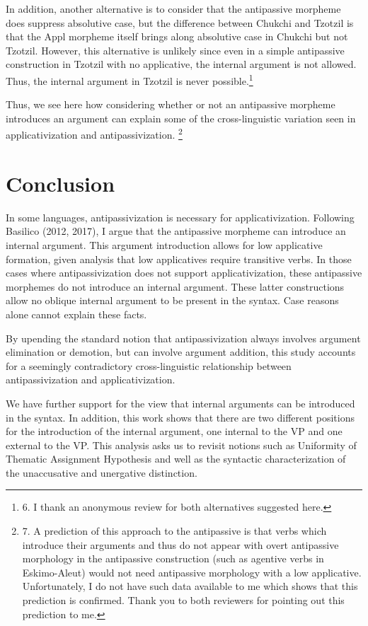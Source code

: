 \documentclass[output=paper,modfonts,nonflat]{langsci/langscibook}
\begin{document}
In addition, another alternative is to consider that the antipassive morpheme does suppress absolutive case, but the difference between Chukchi and Tzotzil is that the Appl morpheme itself brings along absolutive case in Chukchi but not Tzotzil.\textstyleFootnoteSymbol{} However, this alternative is unlikely since even in a simple antipassive construction in Tzotzil with no applicative, the internal argument is not allowed.  Thus, the internal argument in Tzotzil is never possible.\footnote{6.  I thank an anonymous review for both alternatives suggested here.} \textstyleFootnoteSymbol{} 

Thus, we see here how considering whether or not an antipassive morpheme introduces an argument can explain some of the cross-linguistic variation seen in applicativization and antipassivization.\textstyleFootnoteSymbol{} \footnote{7.  A prediction of this approach to the antipassive is that verbs which introduce their arguments and thus do not appear with overt antipassive morphology in the antipassive construction (such as agentive verbs in Eskimo-Aleut) would not need antipassive morphology with a low applicative.   Unfortunately, I do not have such data available to me which shows that this prediction is confirmed.  Thank you to both reviewers for pointing out this prediction to me.}    

\section{Conclusion} %

In some languages, antipassivization is necessary for applicativization.  Following Basilico (2012, 2017), I argue that the antipassive morpheme can introduce an internal argument.  This argument introduction allows for low applicative formation, given  analysis that low applicatives require transitive verbs.  In those cases where antipassivization does not support applicativization, these antipassive morphemes do not introduce an internal argument.  These latter constructions allow no oblique internal argument to be present in the syntax.  Case reasons alone cannot explain these facts. 

By upending the standard notion that antipassivization always involves argument elimination or demotion, but can involve argument addition, this study accounts for a seemingly contradictory cross-linguistic relationship between antipassivization and applicativization.

We have further support for the view that internal arguments can be introduced in the syntax.  In addition, this work shows that there are two different positions for the introduction of the internal argument, one internal to the VP and one external to the VP.  This analysis asks us to revisit notions such as  Uniformity of Thematic Assignment Hypothesis and well as the syntactic characterization of the unaccusative and unergative distinction. 
\end{document}
